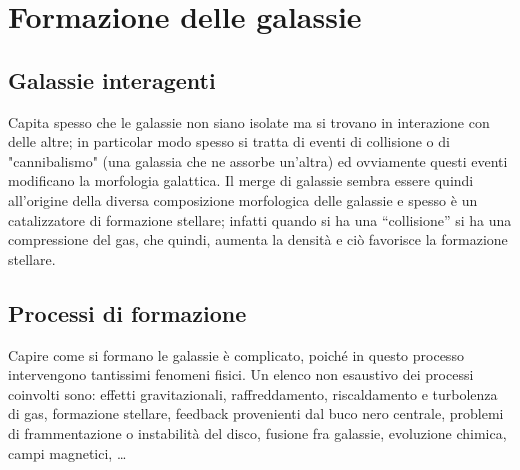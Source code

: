 \section{Formazione delle galassie}\label{sec:formazione-delle-galassie}
\subsection{Galassie interagenti}
Capita spesso che le galassie non siano isolate ma si trovano in interazione con delle altre; in particolar modo spesso si tratta di eventi di collisione o di "cannibalismo" (una galassia che ne assorbe un'altra) ed ovviamente questi eventi modificano la morfologia galattica. Il merge di galassie sembra essere quindi all’origine della diversa composizione morfologica delle galassie e spesso è un catalizzatore di formazione stellare; infatti quando si ha una “collisione” si ha una compressione del gas, che quindi, aumenta la densità e ciò favorisce la formazione stellare.

\subsection{Processi di formazione}
Capire come si formano le galassie è complicato, poiché in questo processo intervengono tantissimi fenomeni fisici. Un elenco non esaustivo dei processi coinvolti sono: effetti gravitazionali, raffreddamento, riscaldamento e turbolenza di gas, formazione stellare, feedback provenienti dal buco nero centrale, problemi di frammentazione o instabilità del disco, fusione fra galassie, evoluzione chimica, campi magnetici, \dots

